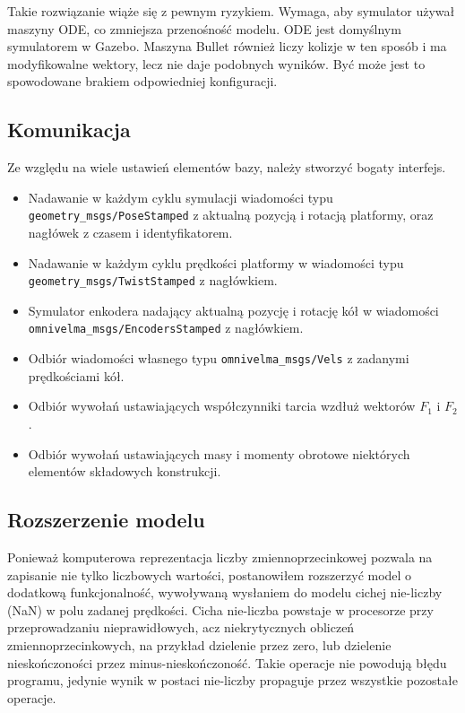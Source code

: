		Takie rozwiązanie wiąże się z pewnym ryzykiem.
		Wymaga, aby symulator używał maszyny ODE, co zmniejsza przenośność modelu. ODE jest domyślnym symulatorem w Gazebo.
		Maszyna Bullet również liczy kolizje w ten sposób i ma modyfikowalne wektory, lecz nie daje podobnych wyników. Być może jest to spowodowane brakiem odpowiedniej konfiguracji.

	\subsection{Komunikacja}
		Ze względu na wiele ustawień elementów bazy, należy stworzyć bogaty interfejs.
		\begin{itemize}
		\item Nadawanie w każdym cyklu symulacji wiadomości typu \texttt{geometry\_msgs/PoseStamped} z aktualną pozycją i rotacją platformy, oraz nagłówek z czasem i identyfikatorem.
		\item Nadawanie w każdym cyklu prędkości platformy w wiadomości typu \texttt{geometry\_msgs/TwistStamped} z nagłówkiem.
		\item Symulator enkodera nadający aktualną pozycję i rotację kół w wiadomości \texttt{omnivelma\_msgs/EncodersStamped} z nagłówkiem.
		\item Odbiór wiadomości własnego typu \texttt{omnivelma\_msgs/Vels} z zadanymi prędkościami kół.
		\item Odbiór wywołań ustawiających współczynniki tarcia wzdłuż wektorów $F_1$ i $F_2$.
		\item Odbiór wywołań ustawiających masy i momenty obrotowe niektórych elementów składowych konstrukcji.
		\end{itemize}

	\subsection{Rozszerzenie modelu}
		\label{sec:model_nan}
		Ponieważ komputerowa reprezentacja liczby zmiennoprzecinkowej pozwala na zapisanie nie tylko liczbowych wartości, postanowiłem rozszerzyć model o dodatkową funkcjonalność,
		wywoływaną wysłaniem do modelu cichej nie-liczby (NaN) w polu zadanej prędkości. Cicha nie-liczba powstaje w procesorze przy przeprowadzaniu 
		nieprawidłowych, acz niekrytycznych obliczeń zmiennoprzecinkowych, na przykład dzielenie przez zero, lub dzielenie nieskończoności przez minus-nieskończoność.
		Takie operacje nie powodują błędu programu, jedynie wynik w postaci nie-liczby propaguje przez wszystkie pozostałe operacje.

